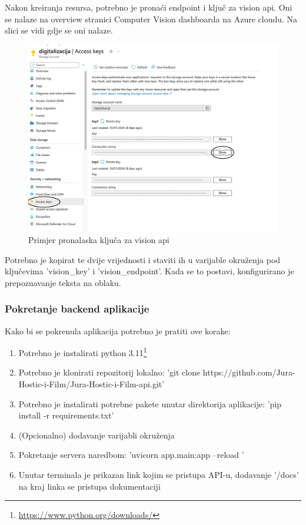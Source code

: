 			{Nakon kreiranja resursa, potrebno je pronaći endpoint i ključ za vision api. Oni se nalaze na overview stranici Computer Vision dashboarda na Azure cloudu. Na slici se vidi gdje se oni nalaze.}
			
			\begin{figure}[H]
				\includegraphics[width=\textwidth]{slike/accessKey.png}
				\caption{Primjer pronalaska ključa za vision api}
				\label{fig:visionApiKey}
			\end{figure}
			
			{Potrebno je kopirat te dvije vrijednosti i staviti ih u varijable okruženja pod ključevima 'vision\_key' i 'vision\_endpoint'. Kada se to postavi, konfigurirano je prepoznavanje teksta na oblaku.}
			
			\subsubsection{Pokretanje backend aplikacije}
			
			{Kako bi se pokrenula aplikacija potrebno je pratiti ove korake:}
			
			\begin{enumerate}
				\item{Potrebno je instalirati python 3.11\footnote{\url{https://www.python.org/downloads/}}}
				\item{Potrebno je klonirati repozitorij lokalno: 'git clone https://github.com/Jura-Hostic-i-Film/Jura-Hostic-i-Film-api.git'}
				\item{Potrebno je instalirati potrebne pakete unutar direktorija aplikacije: 'pip install -r requirements.txt'}
				\item{(Opcionalno) dodavanje varijabli okruženja}
				\item{Pokretanje servera naredbom: 'uvicorn app.main:app --reload '}
				\item{Unutar terminala je prikazan link kojim se pristupa API-u, dodavanje '/docs' na kraj linka se pristupa dokumentaciji}
			\end{enumerate}
			
